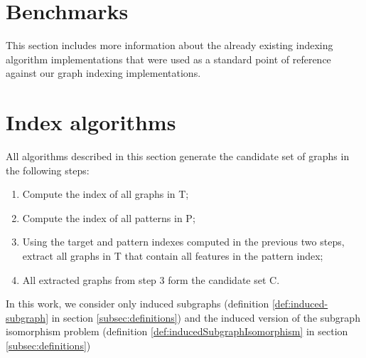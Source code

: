 \documentclass{l4proj}
\begin{document}



\section{Benchmarks} %
This section includes more information about the already existing indexing algorithm implementations that were used as a standard point of reference against our graph indexing implementations. 





\section{Index algorithms}

    All algorithms described in this section generate the candidate set of graphs in the following steps:
    
    \begin{enumerate}
        \label{indexSteps}
        \item Compute the index of all graphs in T;
        \item Compute the index of all patterns in P;
        \item Using the target and pattern indexes computed in the previous two steps, extract all graphs in T that contain all features in the pattern index;
        \item All extracted graphs from step 3 form the candidate set C.
	\end{enumerate}
    
    In this work, we consider only induced subgraphs (definition \ref{def:induced-subgraph} in section \ref{subsec:definitions}) and the induced version of the subgraph isomorphism problem (definition \ref{def:inducedSubgraphIsomorphism} in section \ref{subsec:definitions})
    
\end{document}
